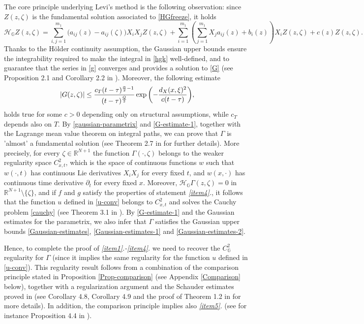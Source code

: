 \documentclass[11pt,a4paper]{article}
\numberwithin{equation}{section}
\def \rnn {{\mathbb {R}}^{N+1}}
\def \GG {{\mathbb{G}}}
\def \p {\partial}
\def \H {\mathscr{H}_\GG}
\def \a {{\alpha}}
\def \G {{\Gamma}}
\def \t {{\tau}}
\def \x {{\xi}}
\def \z {{\zeta}}
\begin{document}
\begin{pf-fundamental}
	 
	The core principle underlying Levi's method is the following observation: since $Z(z,\z)$ is the fundamental solution associated to \eqref{HGfreeze}, it holds
	\begin{equation}\label{H-Levi}
		\H Z(z,\z)\!=\!\!\!\sum_{i,j=1}^{m_1}\!\!\big(a_{ij}(z)-a_{ij}(\z)\big)X_iX_jZ(z,\z)+\sum_{i=1}^{m_1}\!\left(\sum_{j=1}^{m_1}X_ja_{ij}(z) + b_i(z)\right)\!\!X_iZ(z,\z)+c(z)Z(z,\z).
	\end{equation}
	Thanks to the H\"older continuity assumption, the Gaussian upper bounds ensure the integrability required to make the integral in \eqref{hgk} well-defined, and to guarantee that the series in \eqref{g} converges and provides a solution to \eqref{G} (see Proposition 2.1 and Corollary 2.2 in \cite{bonfiglioli2004fundamental}). Moreover, the following estimate 
	\begin{equation}\label{G-estimate-1}
		|G(z,\z)|\leq \frac{c_T (t-\tau)^{\frac{\a}{2}-1}}{(t-\t)^{\frac{Q}{2}}}\exp{\left(-\frac{d_X(x,\x)^2}{c(t-\t)}\right)},\\
	\end{equation}
	holds true for some $c>0$ depending only on structural assumptions, while $c_T$ depends also on $T$. By \eqref{gaussian-parametrix} and \eqref{G-estimate-1}, together with the Lagrange mean value theorem on integral paths, we can prove that $\G$ is 'almost' a fundamental solution (see Theorem 2.7 in \cite{bonfiglioli2004fundamental} for further details). More precisely, for every $\z\in \rnn$  the function $\G(\cdot,\z)$  belongs to the weaker regularity space $C_{x,t}^2$, which is the space of continuous functions $w$ such that $w(\cdot,t)$ has continuous Lie derivatives $X_iX_j$ for every fixed $t$, and $w(x, \cdot)$ has continuous time derivative $\p_t$ for every fixed $x$. Moreover, $\H\G(z,\z)=0$ in $\rnn \setminus \{\z\}$, and if $f$ and $g$ satisfy the properties of statement \emph{\ref{item4}.}, it follows that the function $u$ defined in \eqref{u-conv} belongs to $C_{x,t}^2$ and solves the Cauchy problem \eqref{cauchy} (see Theorem 3.1 in \cite{bonfiglioli2004fundamental}). 
	By \eqref{G-estimate-1} and the Gaussian estimates for the parametrix, we also infer that $\G$ satisfies the Gaussian upper bounds \eqref{Gaussian-estimates}, \eqref{Gaussian-estimates-1} and \eqref{Gaussian-estimates-2}.
	
	Hence, to complete the proof of \emph{\ref{item1}.-\ref{item4}.} we need to recover the $C^2_\GG$ regularity for $\G$ (since it implies the same regularity for the function $u$ defined in \eqref{u-conv}). This regularity result follows from a combination of the comparison principle stated in  Proposition \ref{Prop-comparison} (see Appendix \eqref{Comparison} below), together with a regularization argument and the Schauder estimates proved in \cite{bramantibrandolinischauder} (see Corollary 4.8, Corollary 4.9 and the proof of Theorem 1.2 in \cite{bonfiglioli2004fundamental} for more details). In addition, the comparison principle implies also \emph{\ref{item5}.} (see for instance Proposition 4.4 in \cite{bonfiglioli2004fundamental}). 
	

\end{pf-fundamental}
\end{document}
